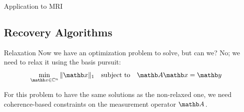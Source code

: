 \begin{frame}{Application to MRI}
\end{frame}

\subsection{Recovery Algorithms}
\begin{frame}{Relaxation}
    Now we have an optimization problem to solve, but can we?
    \pause
    No; we need to relax it using the basis pursuit:
    \begin{equation*}
        \label{eq:basis-pursuit}
        \min_{\xb \in \mathbb{C}^n} \|\xb\|_1 \quad \text{subject to} \quad \Ab \xb = \yb
    \end{equation*}

    \pause
    For this problem to have the same solutions as the non-relaxed one, we need coherence-based constraints on the measurement operator $\Ab$.

\end{frame}

